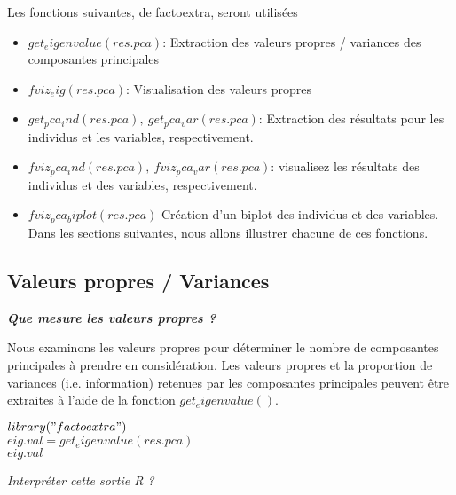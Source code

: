 \documentclass[10pt,a4paper]{report}
\begin{document}
Les fonctions suivantes, de factoextra, seront utilisées

\begin{itemize}
\item  $get_eigenvalue(res.pca)$: Extraction des valeurs propres / variances des composantes principales

\item $fviz_eig(res.pca)$: Visualisation des valeurs propres

\item $get_pca_ind(res.pca),  \ get_pca_var(res.pca)$: Extraction des résultats pour les individus et les variables, respectivement.

\item  $fviz_pca_ind(res.pca), \ fviz_pca_var(res.pca)$: visualisez les résultats des individus et des variables, respectivement.

\item $fviz_pca_biplot(res.pca)$  Création d’un biplot des individus et des variables. Dans les sections suivantes, nous allons illustrer chacune de ces fonctions.

\end{itemize}


\subsection*{Valeurs propres / Variances}

 \textit{\textbf{Que mesure les valeurs propres ?} }
 
 

Nous examinons les valeurs propres pour déterminer le nombre de composantes principales à prendre en considération. Les valeurs propres et la proportion de variances (i.e. information) retenues par les composantes principales peuvent être extraites à l’aide de la fonction $get_eigenvalue()  $.

$library("factoextra")$\\

$eig.val= get_eigenvalue(res.pca)$\\
$eig.val$


\textit{\textit{Interpréter cette sortie R ?}}\\
\end{document}
